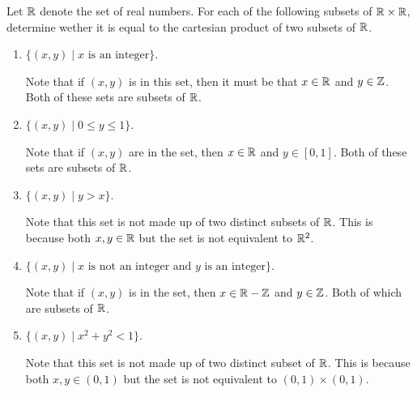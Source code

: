 \documentclass[12pt]{article}
\begin{document}
 Let $\mathbb{R}$ denote the set of real numbers. For each of the following 
subsets of $\mathbb{R} \times \mathbb{R}$, determine wether it is equal to the cartesian product
of two subsets of $\mathbb{R}$.
\begin{enumerate}[label=(\alph*)]
	\item $\{(x, y) \mid x \text{ is an integer}\}$. 
	
	Note that if $(x, y)$ is in this set, then it must be that $x \in \mathbb{R}$ and 
	$y \in \mathbb{Z}$. Both of these sets are subsets of $\mathbb{R}$.
	\item $\{(x, y) \mid 0 \leq y \leq 1\}$.
	
	Note that if $(x, y)$ are in the set, then $x \in \mathbb{R}$ and $y \in [0, 1]$. Both of 
	these sets are subsets of $\mathbb{R}$.
	\item $\{(x, y) \mid y > x\}$.
	
	Note that this set is not made up of two distinct subsets of $\mathbb{R}$. This is because
	both $x, y \in \mathbb{R}$ but the set is not equivalent to $\mathbb{R}^2$.
	\item $\{(x, y) \mid x \text{ is not an integer and } y \text{ is an integer}\}$.
	
	Note that if $(x, y)$ is in the set, then $x \in \mathbb{R} - \mathbb{Z}$ and $y \in \mathbb{Z}$. Both of 
	which are subsets of $\mathbb{R}$.
	\item $\{(x, y) \mid x^2 + y^2 < 1\}$.
	
	Note that this set is not made up of two distinct subset of $\mathbb{R}$. This is because
	both $x, y \in (0, 1)$ but the set is not equivalent to $(0, 1) \times (0, 1)$.
\end{enumerate}
\end{document}
